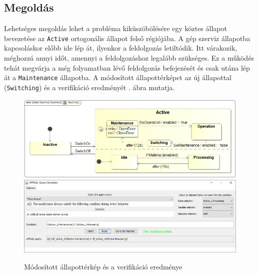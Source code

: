 \subsection{Megoldás}
Lehetséges megoldás lehet a probléma kiküszöbölésére egy köztes állapot bevezetése az \verb+Active+ ortogonális állapot felső régiójába. A gép szerviz állapotba kapcsoláskor előbb ide lép át, ilyenkor a feldolgozás letiltódik. Itt várakozik, méghozzá annyi időt, amennyi a feldolgozáshoz legalább szükséges. Ez a működés tehát megvárja a még folyamatban lévő feldolgozás befejezését és csak utána lép át a \verb+Maintenance+ állapotba. A módosított állapottérképet az új állapottal (\verb+Switching+) és a verifikáció eredményét . ábra mutatja.
\begin{figure}[H]
	\centering
	\includegraphics[keepaspectratio, width=150mm]{figures/machine2.png}
	\includegraphics[keepaspectratio, width=150mm]{figures/fixed-result.png}
	\caption{Módosított állapottérkép és a verifikáció eredménye}
	\label{fig:machine2}
\end{figure}










